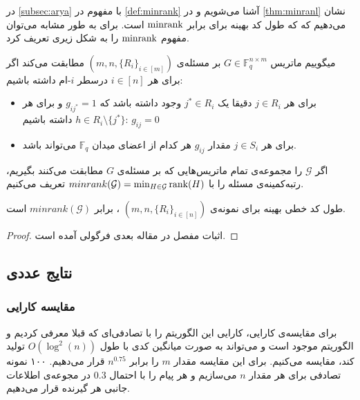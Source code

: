 در
\autoref{subsec:arya}
با مفهوم
در
\autoref{def:minrank}
آشنا می‌شویم و در
\autoref{thm:minranl}
نشان می‌دهیم که که طول کد بهینه برای
\icod
برابر 
$\mathrm{minrank}$
است. برای
\picod
به طور مشابه می‌توان مفهوم
$\mathrm{minrank}$
را به شکل زیری تعریف کرد.
\begin{definition}
	میگوییم ماتریس
	$G \in \mathbb{F}^{n\times m}_q$
	بر مسئله‌ی
	\picod
	$(m, n, \{R_i\}_{i \in [m]})$
	مطابقت می‌کند اگر برای هر
	$i \in [n]$
	درسطر 
	$i$-ام
	داشته باشیم:
	\begin{itemize}
		\item
		برای هر
		$j \in R_i$
		دقیقا یک
		$j^\ast \in R_i$
		وجود داشته باشد که 
		$g_{i j^\ast}= 1$
		و برای هر
		$h \in R_i \setminus \{j^\ast\}$
		داشته باشیم:
		$g_{i j} = 0$ 
		\item
		برای هر
		$j \in S_i$
		مقدار
		$g_{i j}$
		هر کدام از اعضای میدان
		$\mathbb{F}_q$
		می‌تواند باشد.
	\end{itemize}
\end{definition}
\begin{definition}
	اگر
	$\mathcal{G}$
	را مجموعه‌ی تمام ماتریس‌هایی که بر مسئله‌ی
	\picod
	$G$
	مطابقت می‌کنند بگیریم، رتبه‌کمینه‌ی مسئله را با
	$minrank(\mathcal{G}) = \min_{H \in \mathcal{G}} \operatorname{rank}(H)$
	تعریف می‌کنیم.
\end{definition}
\begin{theorem}
	\label{theorem:pliable2016:theorem3}
	طول کد خطی بهینه برای نمونه‌ی
	$(m, n, \{R_i\}_{i \in [n]})$
	،
	\picod
	برابر
	$minrank(\mathcal{G})$
	است.
\end{theorem}
\begin{proof}
	اثبات مفصل در مقاله  بعدی فرگولی 
	\cite{song2016deterministic}
	آمده است.
\end{proof}

\subsection{
نتایج عددی
}
\subsubsection{
مقایسه کارایی
}
برای مقایسه‌ی کارایی، کارایی این الگوریتم را با تصادفی‌ای که قبلا معرفی کردیم و
الگوریتم موجود است و می‌تواند به صورت میانگین کدی با طول
$O(\log^2(n))$
تولید کند، مقایسه می‌کنیم. برای این مقایسه مقدار
$m$
را برابر
$n^{0.75}$
قرار می‌دهیم. ۱۰۰ نمونه تصادفی برای هر مقدار
$n$
می‌سازیم و هر پیام را با احتمال
$0.3$
در مجوعه‌ی اطلاعات جانبی هر گیرنده قرار می‌دهیم.

